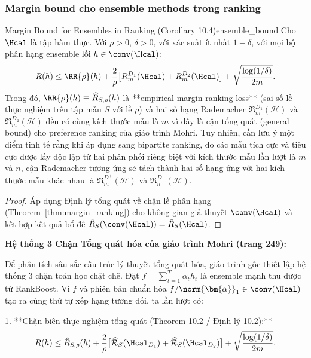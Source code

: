 \subsubsection{Margin bound cho ensemble methods trong ranking}

\begin{corollary}{Margin Bound for Ensembles in Ranking (Corollary 10.4)}{ensemble_bound}
Cho $\Hcal$ là tập hàm thực. Với $\rho > 0$, $\delta > 0$, với xác suất ít nhất $1 - \delta$, với mọi bộ phân hạng ensemble lồi $h \in \conv(\Hcal)$:
\begin{equation}
    R(h) \leq \RR{\rho}(h) + \frac{2}{\rho}\bigl[R^{D_1}_m(\Hcal) + R^{D_2}_m(\Hcal)\bigr] + \sqrt{\frac{\log(1/\delta)}{2m}}.
    \label{eq:ensemble_bound_formula}
\end{equation}
Trong đó, $\RR{\rho}(h) \equiv \widehat{R}_{S,\rho}(h)$ là **empirical margin ranking loss** (sai số lề thực nghiệm trên tập mẫu $S$ với lề $\rho$) và hai số hạng Rademacher $\mathfrak{R}_m^{D_1}(\mathcal{H})$ và $\mathfrak{R}_m^{D_2}(\mathcal{H})$ đều có cùng kích thước mẫu là $m$ vì đây là cận tổng quát (general bound) cho preference ranking của giáo trình Mohri. Tuy nhiên, cần lưu ý một điểm tinh tế rằng khi áp dụng sang bipartite ranking, do các mẫu tích cực và tiêu cực được lấy độc lập từ hai phân phối riêng biệt với kích thước mẫu lần lượt là $m$ và $n$, cận Rademacher tương ứng sẽ tách thành hai số hạng ứng với hai kích thước mẫu khác nhau là $\mathfrak{R}_m^{D^+}(\mathcal{H})$ và $\mathfrak{R}_n^{D^-}(\mathcal{H})$.
\end{corollary}

\begin{proof}
Áp dụng Định lý tổng quát về chặn lề phân hạng (Theorem~\ref{thm:margin_ranking}) cho không gian giả thuyết $\conv(\Hcal)$ và kết hợp kết quả bổ đề $\hat{R}_S(\conv(\Hcal)) = \hat{R}_S(\Hcal)$.
\end{proof}

\textbf{Hệ thống 3 Chặn Tổng quát hóa của giáo trình Mohri (trang 249):}

Để phân tích sâu sắc cấu trúc lý thuyết tổng quát hóa, giáo trình gốc \citep{mohri2018foundations} thiết lập hệ thống 3 chặn toán học chặt chẽ. Đặt $f = \sum_{t=1}^T \alpha_t h_t$ là ensemble mạnh thu được từ RankBoost. Vì $f$ và phiên bản chuẩn hóa $f/\norm{\bm{\alpha}}_1 \in \conv(\Hcal)$ tạo ra cùng thứ tự xếp hạng tương đối, ta lần lượt có:

1. **Chặn biên thực nghiệm tổng quát (Theorem 10.2 / Định lý 10.2):**
\begin{equation}
    R(h) \leq \hat{R}_{S,\rho}(h) + \frac{2}{\rho}\bigl[\widehat{\mathcal{R}}_S(\Hcal_{D_1}) + \widehat{\mathcal{R}}_S(\Hcal_{D_2})\bigr] + \sqrt{\frac{\log(1/\delta)}{2m}}.
    \label{eq:bound_thm_10_2}
\end{equation}

